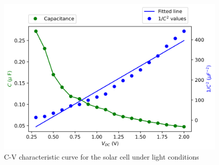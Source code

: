 \documentclass[%
 aip,
 amsmath,amssymb,
 reprint, floatfix%
]{revtex4-2}
\begin{document}
    \begin{figure}
        \centering
        \includegraphics[scale = 0.54]{Figures/plot-cv-light.png}
        \caption{C-V characteristic curve for the solar cell under light conditions}
        \label{fig:cv-light}
    \end{figure}
    
\end{document}
